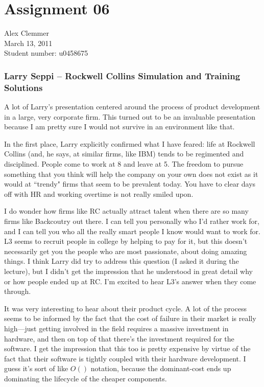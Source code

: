 \documentclass[a4paper]{article}
\begin{document}
\section*{Assignment 06}
Alex Clemmer\\
March 13, 2011\\
Student number: u0458675

\subsubsection*{Larry Seppi -- Rockwell Collins Simulation and Training Solutions}

A lot of Larry's presentation centered around the process of product development in a large, very corporate firm. This turned out to be an invaluable presentation because I am pretty sure I would not survive in an environment like that.

In the first place, Larry explicitly confirmed what I have feared: life at Rockwell Collins (and, he says, at similar firms, like IBM) tends to be regimented and disciplined. People come to work at 8 and leave at 5. The freedom to pursue something that you think will help the company on your own does not exist as it would at ``trendy" firms that seem to be prevalent today. You have to clear days off with HR and working overtime is not really smiled upon.

I do wonder how firms like RC actually attract talent when there are so many firms like Backcoutry out there. I can tell you personally who I'd rather work for, and I can tell you who all the really smart people I know would want to work for. L3 seems to recruit people in college by helping to pay for it, but this doesn't necessarily get you the people who are most passionate, about doing amazing things. I think Larry did try to address this question (I asked it during the lecture), but I didn't get the impression that he understood in great detail why or how people ended up at RC. I'm excited to hear L3's answer when they come through.

It was very interesting to hear about their product cycle. A lot of the process seems to be informed by the fact that the cost of failure in their market is really high---just getting involved in the field requires a massive investment in hardware, and then on top of that there's the investment required for the software. I get the impression that this too is pretty expensive by virtue of the fact that their software is tightly coupled with their hardware development. I guess it's sort of like $O()$ notation, because the dominant-cost ends up dominating the lifecycle of the cheaper components.
\end{document}
